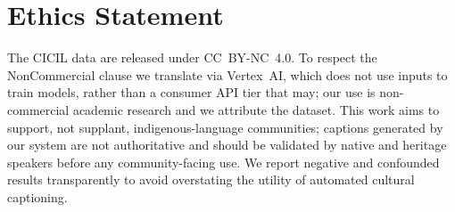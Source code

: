 \documentclass[11pt]{article}
\begin{document}
\section*{Ethics Statement}
The CICIL data are released under CC~BY-NC~4.0. To respect the NonCommercial
clause we translate via Vertex~AI, which does not use inputs to train models,
rather than a consumer API tier that may; our use is non-commercial academic
research and we attribute the dataset. This work aims to support, not supplant,
indigenous-language communities; captions generated by our system are not
authoritative and should be validated by native and heritage speakers before any
community-facing use. We report negative and confounded results transparently to
avoid overstating the utility of automated cultural captioning.



\end{document}
